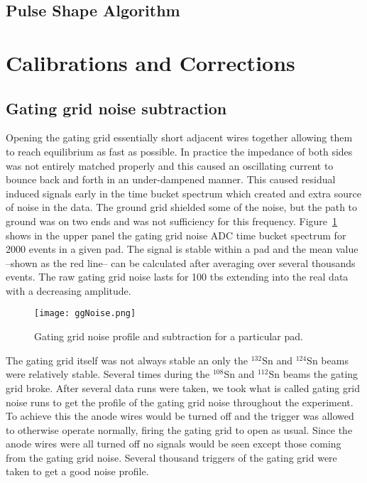 \subsection{Pulse Shape Algorithm}
\label{sec:psa}

\section{Calibrations and Corrections}


\subsection{Gating grid noise subtraction}
Opening the gating grid essentially short adjacent wires together allowing them to reach equilibrium as fast as possible. In practice the impedance of both sides was not entirely matched properly and this caused an oscillating current to bounce back and forth in an under-dampened manner. This caused residual induced signals early in the time bucket spectrum which created and extra source of noise in the data. The ground grid shielded some of the noise, but the path to ground was on two ends and was not sufficiency for this frequency. Figure~\ref{fig:ggNoiseSub} shows in the upper panel the gating grid noise ADC time bucket spectrum for 2000 events in a given pad. The signal is stable within a pad and the mean value --shown as the red line-- can be calculated after averaging over several thousands events. The raw gating grid noise lasts for 100 tbs extending into the real data with a decreasing amplitude. 

\begin{figure}[!htb]
\centering
\texttt{[image: ggNoise.png]}
\caption{Gating grid noise profile and subtraction for a particular pad.}
\label{fig:ggNoiseSub}
\end{figure}


The gating grid itself was not always stable an only the ${}^{132}$Sn and ${}^{124}$Sn beams were relatively stable. Several times during the ${}^{108}$Sn and ${}^{112}$Sn beams the gating grid broke. After several data runs were taken, we took what is called gating grid noise runs to get the profile of the gating grid noise throughout the experiment. To achieve this the anode wires would be turned off and the trigger was allowed to otherwise operate normally, firing the gating grid to open as usual. Since the anode wires were all turned off no signals would be seen except those coming from the gating grid noise. Several thousand triggers of the gating grid were taken to get a good noise profile. 

